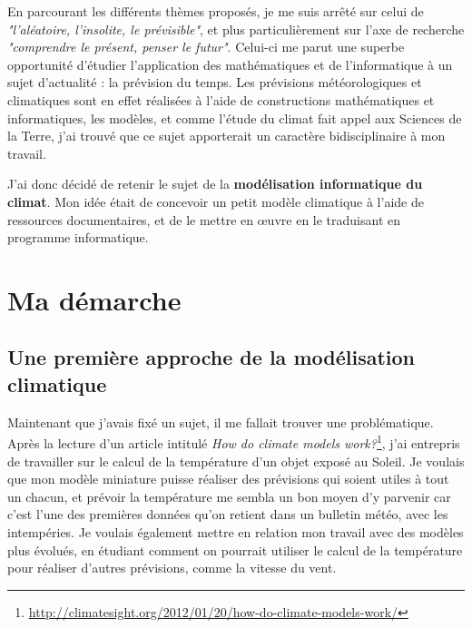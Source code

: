 \documentclass[12pt,a4paper]{article}
\begin{document}
En parcourant les différents thèmes proposés, je me suis arrêté sur celui de  \emph{"l'aléatoire, l'insolite, le prévisible"}, et plus particulièrement sur l'axe de recherche \emph{"comprendre le présent, penser le futur"}.
Celui-ci me parut une superbe opportunité d'étudier l'application des mathématiques et de l'informatique à un sujet d'actualité : la prévision du temps.
Les prévisions météorologiques et climatiques sont en effet réalisées à l'aide de constructions mathématiques et informatiques, les modèles, et comme l'étude du climat fait appel aux Sciences de la Terre, j'ai trouvé que ce sujet apporterait un caractère bidisciplinaire à mon travail.

J'ai donc décidé de retenir le sujet de la \textbf{modélisation informatique du climat}.
Mon idée était de concevoir un petit modèle climatique à l'aide de ressources documentaires, et de le mettre en œuvre en le traduisant en programme informatique.



\section{Ma démarche}


\subsection{Une première approche de la modélisation climatique}

Maintenant que j'avais fixé un sujet, il me fallait trouver une problématique.
Après la lecture d'un article intitulé \emph{How do climate models work?}\footnote{\url{http://climatesight.org/2012/01/20/how-do-climate-models-work/}}, j'ai entrepris de travailler sur le calcul de la température d'un objet exposé au Soleil.
Je voulais que mon modèle miniature puisse réaliser des prévisions qui soient utiles à tout un chacun, et prévoir la température me sembla un bon moyen d'y parvenir car c'est l'une des premières données qu'on retient dans un bulletin météo, avec les intempéries.
Je voulais également mettre en relation mon travail avec des modèles plus évolués, en étudiant comment on pourrait utiliser le calcul de la température pour réaliser d'autres prévisions, comme la vitesse du vent.
\end{document}

